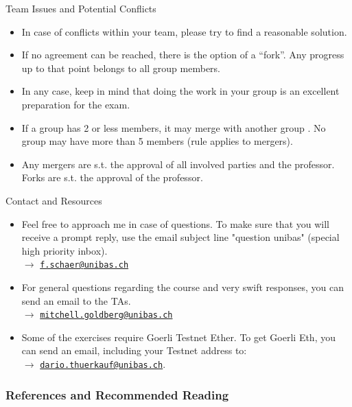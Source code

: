 \documentclass[handout]{beamer}
\begin{document}
\begin{frame}{Team Issues and Potential Conflicts}
\begin{itemize}
	\item<1-> In case of conflicts within your team, please try to find a \color{focus} reasonable solution\color{black}. 
	\item<2-> If no agreement can be reached, there is \color{focus} the option of a ``fork''\color{black}. Any progress up to that point belongs to all group members. 
	\item<3-> In any case, keep in mind that doing the work in your group is an \color{focus} excellent preparation for the exam\color{black}. 
	\item<4-> If a group \color{focus} has 2 or less members, it may merge with another group \color{black}. No group may have more than 5 members (rule applies to mergers). 
	\item<5-> Any mergers are \color{focus} s.t. the approval \color{black} of all involved parties and the professor. Forks are s.t. the approval of the professor.
\end{itemize}
\end{frame}


\begin{frame}{Contact and Resources}
\begin{itemize}
	\item<1-> Feel free to approach me in case of questions. To make sure that you will receive a prompt reply, use the email subject line "question unibas" (special high priority inbox). \\ $\rightarrow$ \href{mailto:f.schaer@unibas.ch?subject=question\%20unibas}{\texttt{f.schaer@unibas.ch}}
	\item<2-> For general questions regarding the course and very swift responses, you can send an email to the TAs. \\$\rightarrow$ \href{mailto:mitchell.goldberg@unibas.ch?subject=question\%20unibas}{\texttt{mitchell.goldberg@unibas.ch}}
	\item<3-> Some of the exercises require Goerli Testnet Ether. To get Goerli Eth, you can send an email, including your Testnet address to: \\
	$\rightarrow$ \href{mailto:dario.thuerkauf@unibas.ch?subject=Goerli\%20ETH}{\texttt{dario.thuerkauf@unibas.ch}}.
\end{itemize}
\end{frame}


\begin{frame}%
\frametitle{References and Recommended Reading}
	
	
\end{frame}
\end{document}
